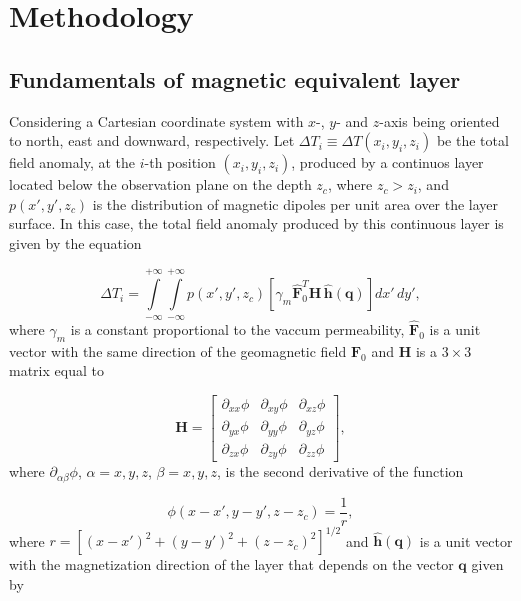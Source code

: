 \section{Methodology}
\label{sec:methodology}

\subsection{Fundamentals of magnetic equivalent layer}
\label{subsec:mag_eqlayer}

Considering a Cartesian coordinate system with $x$-, $y$- and $z$-axis being oriented to north, east and downward, respectively. Let $\Delta T_i \equiv \Delta T (x_i,y_i,z_i)$ be the total field anomaly, at the $i$-th position $(x_i,y_i,z_i)$, produced by a continuos layer located below the observation plane on the depth $z_c$, where $z_c > z_i$, and $p(x',y',z_c)$ is the distribution of magnetic dipoles per unit area over the layer surface. In this case, the total field anomaly produced by this continuous layer is given by the equation 

\begin{equation}
\Delta T_i = \int \limits_{-\infty}^{+\infty } \int \limits_{-\infty}^{+\infty }  p(x',y',z_c)  [\gamma_m \hat{\mathbf{F}}_0^T \mathbf{H} \,\hat{\mathbf{h}}(\mathbf{q})] dx' \,dy',
\label{eq:continuous_layer}
\end{equation}
where $\gamma_m$ is a constant proportional to the vaccum permeability, $\hat{\mathbf{F}}_0$ is a unit vector with the same direction of the geomagnetic field $\mathbf{F}_0$ and $\mathbf{H}$ is a $3 \times 3$ matrix equal to  

 \begin{equation}
   \mathbf{H} =
   \left[ \begin{array}{ccc}
   \partial_{xx} \phi & \partial_{xy} \phi &\partial_{xz} \phi \\  \partial_{yx} \phi & \partial_{yy} \phi &\partial_{yz} \phi \\  \partial_{zx} \phi &\partial_{zy}\phi  & \partial_{zz} \phi    
   \end{array} \right] ,
   \label{eq:H}
 \end{equation}
where $\partial_{\alpha \beta}\phi$, $\alpha = x, y, z$, $\beta = x, y, z$, is the second derivative of the function 

\begin{equation}
   \phi (x-x', y-y', z-z_c) = \frac{1}{r} ,
   \label{eq:phi}
 \end{equation}
where $r = [(x-x')^2 + (y-y')^2 + (z-z_c)^2]^{1/2}$ and $\hat{\mathbf{h}}(\mathbf{q})$ is a unit vector with the magnetization direction of the layer that depends on the vector $\mathbf{q}$ given by 

